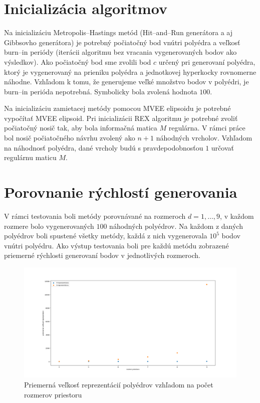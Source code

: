 \section{Inicializácia algoritmov}

Na inicializáciu Metropolis--Hastings metód (Hit--and--Run generátora a aj Gibbsovho generátora) je potrebný počiatočný bod vnútri polyédra a veľkosť burn--in periódy (iterácii algoritmu bez vracania vygenerovaných bodov ako výsledkov). Ako počiatočný bod sme zvolili bod $c$ určený pri generovaní polyédra, ktorý je vygenerovaný na prieniku polyédra a jednotkovej hyperkocky rovnomerne náhodne. Vzhľadom k tomu, že generujeme veľké množstvo bodov v polyédri, je burn--in perióda nepotrebná. Symbolicky bola zvolená hodnota $100$.

Na inicializáciu zamietacej metódy pomocou MVEE elipsoidu je potrebné vypočítať MVEE elipsoid. Pri inicializácii REX algoritmu je potrebné zvoliť počiatočný nosič tak, aby bola informačná matica $M$ regulárna. V rámci práce bol nosič počiatočného návrhu zvolený ako $n+1$ náhodných vrcholov. Vzhľadom na náhodnosť polyédra, dané vrcholy budú s pravdepodobnosťou $1$ určovať regulárnu maticu $M$.

\section{Porovnanie rýchlostí generovania}

V rámci testovania boli metódy porovnávané na rozmeroch $d=1, \dots, 9$, v každom rozmere bolo vygenerovaných $100$ náhodných polyédrov. Na každom z daných polyédrov boli spustené všetky metódy, každá z nich vygenerovala $10^5$ bodov vnútri polyédru. Ako výstup testovania boli pre každú metódu zobrazené priemerné rýchlosti generovaní bodov v jednotlivých rozmeroch.\\

\begin{figure} [H]
	\includegraphics[width=\linewidth]{images/velkost_rep.png}
	\caption{Priemerná veľkosť reprezentácií polyédrov vzhľadom na počet rozmerov priestoru}
	\label{fig:velkost_rep}
\end{figure}

